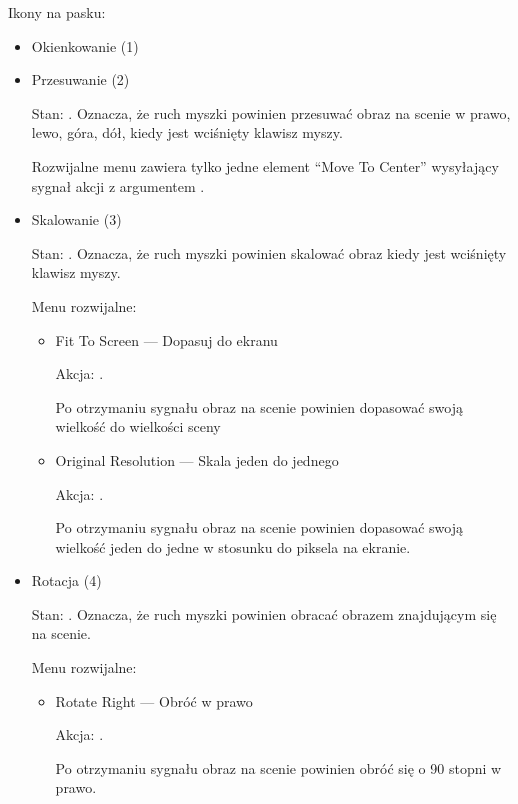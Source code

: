 Ikony na pasku:
\begin{itemize}
    \item Okienkowanie (1)

    \item Przesuwanie (2)

          Stan: .
          Oznacza, że ruch myszki powinien przesuwać obraz na scenie w prawo, lewo, góra, dół, kiedy jest wciśnięty klawisz myszy.

          Rozwijalne menu zawiera tylko jedne element \enquote{Move To Center} wysyłający sygnał akcji z argumentem .

    \item Skalowanie (3)

          Stan: .
          Oznacza, że ruch myszki powinien skalować obraz kiedy jest wciśnięty klawisz myszy.

          Menu rozwijalne:
          \begin{itemize}
              \item Fit To Screen --- Dopasuj do ekranu

                    Akcja: .

                    Po otrzymaniu sygnału obraz na scenie powinien dopasować swoją wielkość do wielkości sceny

              \item Original Resolution --- Skala jeden do jednego

                    Akcja: .

                    Po otrzymaniu sygnału obraz na scenie powinien dopasować swoją wielkość jeden do jedne w stosunku do piksela na ekranie.

          \end{itemize}

    \item Rotacja (4)

          Stan: .
          Oznacza, że ruch myszki powinien obracać obrazem znajdującym się na scenie.

          Menu rozwijalne:
          \begin{itemize}
              \item Rotate Right --- Obróć w prawo

                    Akcja: .

                    Po otrzymaniu sygnału obraz na scenie powinien obróć się o 90 stopni w prawo.


\end{itemize}
\end{itemize}
